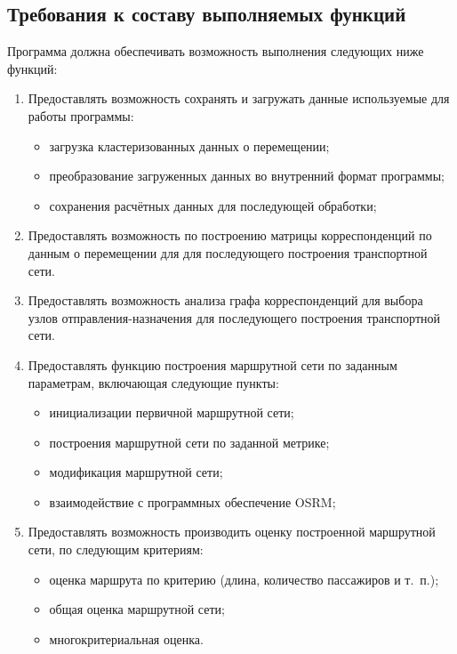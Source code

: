 \subsection{Требования к составу выполняемых функций}
Программа должна обеспечивать возможность выполнения следующих ниже функций:
\begin{enumerate}
    \item Предоставлять возможность сохранять и загружать данные используемые для работы программы:
    \begin{itemize}
        \item загрузка кластеризованных данных о перемещении;
        \item преобразование загруженных данных во внутренний формат программы;
        \item сохранения расчётных данных для последующей обработки;
    \end{itemize}
    \item Предоставлять возможность по построению матрицы корреспонденций по данным о перемещении для 
        для последующего построения транспортной сети.
    \item Предоставлять возможность анализа графа корреспонденций для выбора узлов отправления-назначения для 
        последующего построения транспортной сети.
    \item Предоставлять функцию построения маршрутной сети по заданным параметрам, включающая следующие пункты:
    \begin{itemize}
        \item инициализации первичной маршрутной сети;
        \item построения маршрутной сети по заданной метрике;
        \item модификация маршрутной сети;
        \item взаимодействие с программных обеспечение OSRM;
    \end{itemize}
    \item Предоставлять возможность производить оценку построенной маршрутной сети, по следующим критериям:
    \begin{itemize}
        \item оценка маршрута по критерию (длина, количество пассажиров и т.~п.);
        \item общая оценка маршрутной сети;
        \item многокритериальная оценка.
    \end{itemize}
\end{enumerate}

